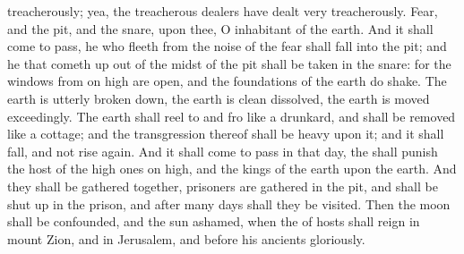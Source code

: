 {treacherously; yea, the treacherous
dealers have dealt
very
treacherously.
Fear, and the
pit, and the
snare,
{} upon thee, O
inhabitant of the
earth.
And it shall come to pass,
{} he who
fleeth from the
noise of the
fear shall
fall into the
pit; and he that cometh
up out of the
midst of the
pit shall be
taken in the
snare: for the
windows from on
high are
open, and the
foundations of the
earth do
shake.
The
earth is
utterly broken
down, the
earth is
clean
dissolved, the
earth is
moved
exceedingly.
The
earth shall
reel to and
fro like a
drunkard, and shall be
removed like a
cottage; and the
transgression thereof shall be
heavy upon it; and it shall
fall, and not
rise
again.
And it shall come to pass in that
day,
{} the
{} shall
punish the
host of the high
ones
{} on
high, and the
kings of the
earth upon the
earth.
And they shall be gathered
together,
{}
prisoners are
gathered in the
pit, and shall be shut
up in the
prison, and after
many
days shall they be
visited.
Then the
moon shall be
confounded, and the
sun
ashamed, when the
{} of
hosts shall
reign in
mount
Zion, and in
Jerusalem, and before his
ancients
gloriously.

}
